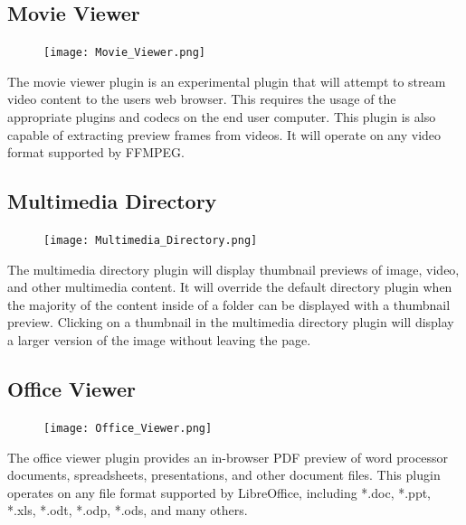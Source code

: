 \documentclass[10pt]{article}
\begin{document}
\subsection{Movie Viewer}
\begin{figure}
		\texttt{[image: Movie\_Viewer.png]}
\end{figure}
The movie viewer plugin is an experimental plugin that will attempt to stream video content to the users web browser.  This requires the usage of the appropriate plugins and codecs on the end user computer.  This plugin is also capable of extracting preview frames from videos.  It will operate on any video format supported by FFMPEG.

\endgroup

\clearpage
\begingroup
\setlength\intextsep{0pt}
\subsection{Multimedia Directory}
\begin{figure}
		\texttt{[image: Multimedia\_Directory.png]}
\end{figure}
The multimedia directory plugin will display thumbnail previews of image, video, and other multimedia content.  It will override the default directory plugin when the majority of the content inside of a folder can be displayed with a thumbnail preview.  Clicking on a thumbnail in the multimedia directory plugin will display a larger version of the image without leaving the page. 

\endgroup

\hfill \break
\hfill \break
\hfill \break
\hfill \break
\hfill \break
\hfill \break
\hfill \break
\hfill \break
\hfill \break
\hfill \break

\begingroup
\setlength\intextsep{0pt}
\subsection{Office Viewer}
\begin{figure}
		\texttt{[image: Office\_Viewer.png]}
\end{figure}
The office viewer plugin provides an in-browser PDF preview of word processor documents, spreadsheets, presentations, and other document files.  This plugin operates on any file format supported by LibreOffice, including *.doc, *.ppt, *.xls, *.odt, *.odp, *.ods, and many others.

\endgroup
\end{document}
